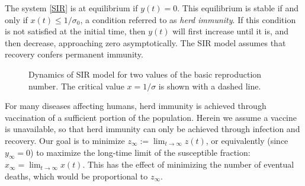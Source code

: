 \documentclass[english,12pt,letter]{article}
\newcommand{\Rnot}{\sigma_0}
\newcommand{\Sinf}{x_\infty}
\begin{document}
The system \eqref{SIR} is at equilibrium if $y(t)=0$.  This equilibrium is stable if and
only if $x(t)\le 1/\Rnot$, a condition referred to as {\em herd immunity}.  If
this condition is not satisfied at
the initial time, then $y(t)$ will first increase until it is, and then decrease,
approaching zero asymptotically.  The SIR model assumes that recovery
confers permanent immunity.

\begin{figure}
    \centering
    \caption{Dynamics of SIR model for two values of the basic reproduction number.
            The critical value $x=1/\sigma$ is shown with a dashed line.\label{fig:dynamics}}
\end{figure}

For many diseases affecting humans, herd immunity is achieved
through vaccination of a sufficient portion of the population.  Herein
we assume a vaccine is unavailable, so that herd immunity can only be achieved
through infection and recovery.
Our goal is to minimize $z_\infty := \lim_{t \to \infty} z(t)$, or equivalently
(since $y_\infty=0$)
to maximize the long-time limit of the susceptible fraction:
$\Sinf = \lim_{t\to\infty} x(t)$.
This has the effect of minimizing
the number of eventual deaths, which would be proportional to $z_\infty$.
\end{document}
